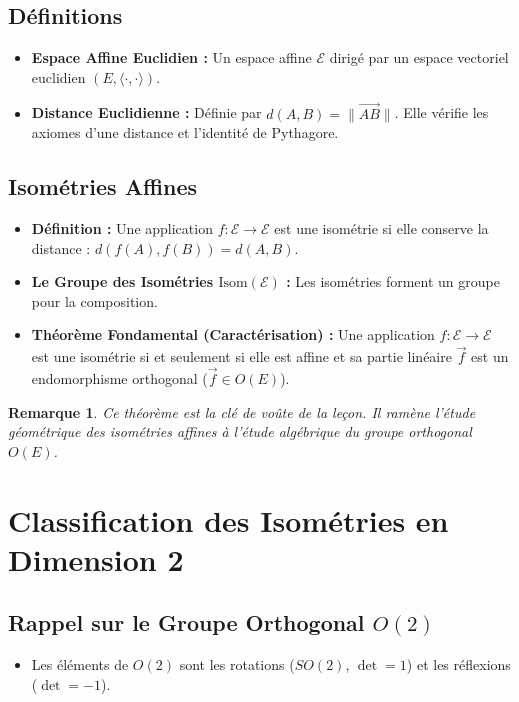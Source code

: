 \documentclass[12pt, a4paper, parskip=full]{report}
\theoremstyle{agregstyle}
\newtheorem{remark}[definition]{Remarque}
\begin{document}
\subsection{Définitions}
\begin{itemize}
    \item \textbf{Espace Affine Euclidien :} Un espace affine $\mathcal{E}$ dirigé par un espace vectoriel euclidien $(E, \langle \cdot, \cdot \rangle)$.
    \item \textbf{Distance Euclidienne :} Définie par $d(A,B) = \|\vec{AB}\|$. Elle vérifie les axiomes d'une distance et l'identité de Pythagore.
\end{itemize}

\subsection{Isométries Affines}
\begin{itemize}
    \item \textbf{Définition :} Une application $f: \mathcal{E} \to \mathcal{E}$ est une isométrie si elle conserve la distance : $d(f(A),f(B))=d(A,B)$.
    \item \textbf{Le Groupe des Isométries $\mathrm{Isom}(\mathcal{E})$ :} Les isométries forment un groupe pour la composition.
    \item \textbf{Théorème Fondamental (Caractérisation) :} Une application $f: \mathcal{E} \to \mathcal{E}$ est une isométrie si et seulement si elle est affine et sa partie linéaire $\vec{f}$ est un endomorphisme orthogonal ($\vec{f} \in O(E)$).
\end{itemize}
\begin{remark}
    Ce théorème est la clé de voûte de la leçon. Il ramène l'étude géométrique des isométries affines à l'étude algébrique du groupe orthogonal $O(E)$.
\end{remark}

\section{Classification des Isométries en Dimension 2}

\subsection{Rappel sur le Groupe Orthogonal $O(2)$}
\begin{itemize}
    \item Les éléments de $O(2)$ sont les rotations ($SO(2)$, $\det=1$) et les réflexions ($\det=-1$).
\end{itemize}
\end{document}
